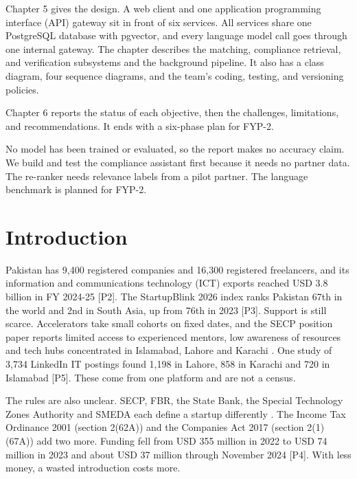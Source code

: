 \documentclass{FastFyp}
\newcommand{\src}[1]{[#1]}
\begin{document}
Chapter 5 gives the design. A web client and one application programming interface (API) gateway sit in front of six services. All services share one PostgreSQL database with pgvector, and every language model call goes through one internal gateway. The chapter describes the matching, compliance retrieval, and verification subsystems and the background pipeline. It also has a class diagram, four sequence diagrams, and the team's coding, testing, and versioning policies.

Chapter 6 reports the status of each objective, then the challenges, limitations, and recommendations. It ends with a six-phase plan for FYP-2.

No model has been trained or evaluated, so the report makes no accuracy claim. We build and test the compliance assistant first because it needs no partner data. The re-ranker needs relevance labels from a pilot partner. The language benchmark is planned for FYP-2.
\pagebreak

\pagestyle{fancy} %
\tableofcontents

\pagebreak
\listoffigures	%
\pagebreak
\listoftables %

\mainmatter

\chapter{Introduction}
Pakistan has 9,400 registered companies and 16,300 registered freelancers, and its information and communications technology (ICT) exports reached USD 3.8 billion in FY 2024-25 \src{P2}. The StartupBlink 2026 index ranks Pakistan 67th in the world and 2nd in South Asia, up from 76th in 2023 \src{P3}. Support is still scarce. Accelerators take small cohorts on fixed dates, and the SECP position paper reports limited access to experienced mentors, low awareness of resources and tech hubs concentrated in Islamabad, Lahore and Karachi \cite{ref:secpposition}. One study of 3,734 LinkedIn IT postings found 1,198 in Lahore, 858 in Karachi and 720 in Islamabad \src{P5}. These come from one platform and are not a census.

The rules are also unclear. SECP, FBR, the State Bank, the Special Technology Zones Authority and SMEDA each define a startup differently \cite{ref:secpposition}. The Income Tax Ordinance 2001 (section 2(62A)) and the Companies Act 2017 (section 2(1)(67A)) add two more. Funding fell from USD 355 million in 2022 to USD 74 million in 2023 and about USD 37 million through November 2024 \src{P4}. With less money, a wasted introduction costs more.
\end{document}
